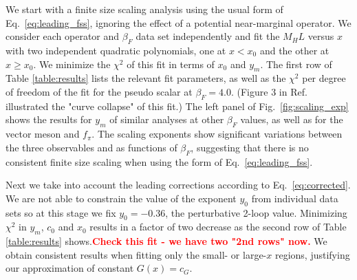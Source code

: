 \documentclass[aps,prl,twocolumn,]{revtex4}  %
\newcommand{\refcite}[1]{Ref.~\cite{#1}}
\newcommand{\eq}[1]{Eq.~\ref{#1}}
\newcommand{\fig}[1]{Fig.~\ref{#1}}
\newcommand{\TODO}[1]{\textcolor{red}{{\bf #1}}}
\begin{document}
We start with a finite size scaling analysis  using the usual form of \eq{eq:leading_fss}, ignoring the effect of a potential near-marginal operator. We consider each operator and $\beta_F$ data set independently and fit the $M_H L$ versus $x$ with two independent quadratic polynomials, one at $x<x_0$ and the other at $x\ge x_0$. We minimize the $\chi^2$ of this fit in terms of $x_0$ and $y_m$.
The first row of  Table \ref{table:results} lists the relevant fit parameters, as well as the $\chi^2$ per degree of freedom of the fit for the pseudo scalar at $\beta_F=4.0$. (Figure 3 in \refcite{Hasenfratz:2013eka} illustrated the "curve collapse" of this fit.) 
The left panel of \fig{fig:scaling_exp} shows the results for $y_m$ of similar analyses at other $\beta_F$ values, as well as for the vector meson and $f_\pi$.
The scaling exponents show significant variations between the three observables and as functions of $\beta_F$, suggesting that there is no consistent finite size scaling when using the form of \eq{eq:leading_fss}.

Next we take into account the leading corrections according to \eq{eq:corrected}. We are not able to constrain the value of the exponent $y_0$ from individual data sets so at this stage we fix $y_0=-0.36$, the perturbative  2-loop value. Minimizing $\chi^2$ in $y_m$, $c_0$ and $x_0$ results in a factor of two decrease as the second row of Table \ref{table:results} shows.\TODO{Check this fit - we have two "2nd rows" now.}
We obtain consistent results when fitting only the small- or large-$x$ regions, justifying our approximation of constant $G(x) = c_G$. %
\end{document}
